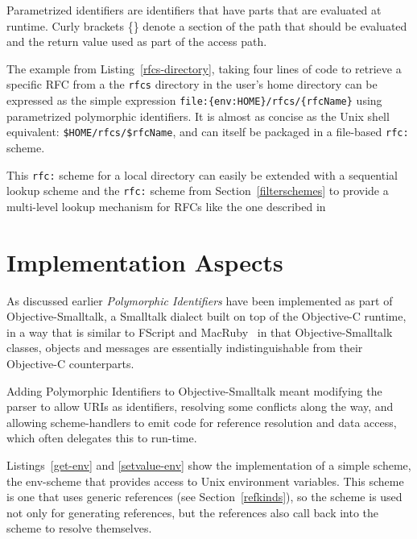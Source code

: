 \documentclass{acm_proc_article-sp}
\begin{document}
Parametrized identifiers are identifiers that have parts that are evaluated
at runtime.  Curly brackets \{\} denote a section of the path that should be evaluated and
the return value used as part of the access path.

The example from Listing~\ref{rfcs-directory}, taking four lines of code to retrieve a specific RFC from a 
the {\tt rfcs} directory in the user's home directory can be expressed as the simple expression
{\tt file:\{env:HOME\}/rfcs/\{rfcName\}} using parametrized polymorphic identifiers.  It is almost
as concise as the Unix shell equivalent: {\tt \$HOME/rfcs/\$rfcName}, and can itself be packaged
in a file-based {\tt rfc:} scheme. 

This {\tt rfc:} scheme for a local directory can easily be extended with a sequential lookup scheme
and the {\tt rfc:} scheme from Section~\ref{filterschemes} to provide a multi-level lookup mechanism
for RFCs like the one described in 



\section{Implementation Aspects}
\label{implementation}

As discussed earlier \emph{Polymorphic Identifiers} have been implemented as part of Objective-Smalltalk,
a Smalltalk dialect built on top of the Objective-C\cite{objc-evol}\cite{objc-apple} runtime, 
in a way that is similar to FScript\cite{fscript} and MacRuby~\cite{macruby} in that Objective-Smalltalk classes,
objects and messages are essentially indistinguishable from their Objective-C counterparts.

Adding Polymorphic Identifiers to Objective-Smalltalk meant modifying the parser to allow URIs as identifiers,
resolving some conflicts along the way,
and allowing scheme-handlers to emit code for reference resolution and data access, which often
delegates this to run-time.



Listings~\ref{get-env} and \ref{setvalue-env} show the implementation of a simple scheme,
the env-scheme that provides access to Unix environment variables.  This scheme is
one that uses generic references (see Section~\ref{refkinds}), so the scheme is used
not only for generating references, but the references also call back into the scheme
to resolve themselves.
\end{document}
